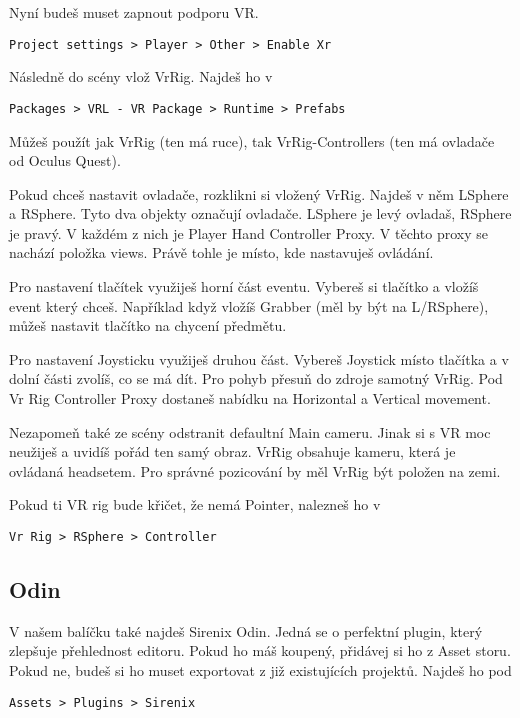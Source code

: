 \documentclass{article}
\begin{document}
Nyní budeš muset zapnout podporu VR.

\begin{lstlisting}
Project settings > Player > Other > Enable Xr
\end{lstlisting}

Následně do scény vlož VrRig. Najdeš ho v 
\begin{lstlisting}
Packages > VRL - VR Package > Runtime > Prefabs
\end{lstlisting}
Můžeš použít jak VrRig (ten má ruce), tak VrRig-Controllers (ten má ovladače od Oculus Quest).

Pokud chceš nastavit ovladače, rozklikni si vložený VrRig. Najdeš v něm LSphere a RSphere. Tyto dva objekty označují ovladače. LSphere je levý ovladaš, RSphere je pravý. V každém z nich je Player Hand Controller Proxy. V těchto proxy se nachází položka views. Právě tohle je místo, kde nastavuješ ovládání.

Pro nastavení tlačítek využiješ horní část eventu. Vybereš si tlačítko a vložíš event který chceš. Například když vložíš Grabber (měl by být na L/RSphere), můžeš nastavit tlačítko na chycení předmětu.

Pro nastavení Joysticku využiješ druhou část. Vybereš Joystick místo tlačítka a v dolní části zvolíš, co se má dít. Pro pohyb přesuň do zdroje samotný VrRig. Pod Vr Rig Controller Proxy dostaneš nabídku na Horizontal a Vertical movement.

Nezapomeň také ze scény odstranit defaultní Main cameru. Jinak si s VR moc neužiješ a uvidíš pořád ten samý obraz. VrRig obsahuje kameru, která je ovládaná headsetem. Pro správné pozicování by měl VrRig být položen na zemi.

Pokud ti VR rig bude křičet, že nemá Pointer, nalezneš ho v
\begin{lstlisting}
Vr Rig > RSphere > Controller
\end{lstlisting}

\subsection{Odin}
V našem balíčku také najdeš Sirenix Odin. Jedná se o perfektní plugin, který zlepšuje přehlednost editoru. Pokud ho máš koupený, přidávej si ho z Asset storu. Pokud ne, budeš si ho muset exportovat z již existujících projektů. Najdeš ho pod
\begin{lstlisting}
Assets > Plugins > Sirenix
\end{lstlisting}
\end{document}
